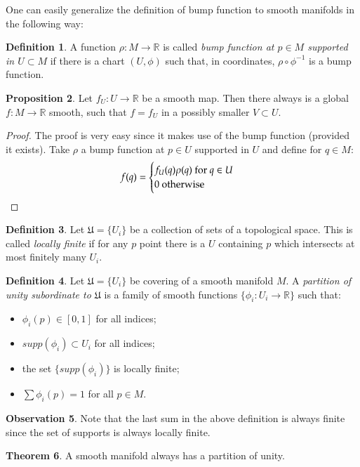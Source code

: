 \documentclass[12pt,a4paper]{report}
\theoremstyle{definition}
\newtheorem{Def}{Definition}[chapter]
\theoremstyle{Theorem}
\newtheorem{Theo}[Def]{Theorem}
\newtheorem{Prop}[Def]{Proposition}
\theoremstyle{break}
\theoremstyle{definition}
\newtheorem{Obs}[Def]{Observation}
\begin{document}
			One can easily generalize the definition of bump function to smooth manifolds in the following way:
			\begin{Def}
				A function $\rho:M\rightarrow \mathbb{R}$ is called \textit{bump function  at $p\in M$ supported in $U\subset M$} if there is a chart $(U,\phi)$ such that, in coordinates, $\rho\circ \phi^{-1}$ is a bump function.
			\end{Def}
			\begin{Prop}
				Let $f_U:U\rightarrow\mathbb{R}$ be a smooth map. Then there always is a global $f:M\rightarrow \mathbb{R}$ smooth, such that $f=f_U$ in a possibly smaller $V\subset U$.
			\end{Prop}
			\begin{proof}
				The proof is very easy since it makes use of the bump function (provided it exists). Take $\rho$ a bump function at $p\in U$ supported in $U$ and define for $q\in M$:
				$$f(q)=\begin{cases}
					f_U(q)\rho(q)\hbox{ for }q\in U\\
					0 \hbox{ otherwise}
				\end{cases}$$
			\end{proof}
			\begin{Def}
				Let $\mathfrak{U}=\{U_i\}$ be a collection of sets of a topological space. This is called \textit{locally finite} if for any $p$ point there is a $U$ containing $p$ which intersects at most finitely many $U_i$. 
			\end{Def}
			\begin{Def}
				Let $\mathfrak{U}=\{U_i\}$ be covering of a smooth manifold $M$. A \textit{partition of unity subordinate to $\mathfrak{U}$} is a family of smooth functions $\{\phi_i:U_i\rightarrow\mathbb{R}\}$ such that:
				\begin{itemize}
					\item $\phi_i(p)\in[0,1]$ for all indices;
					\item $supp(\phi_i)\subset U_i$ for all indices;
					\item the set $\{supp(\phi_i)\}$ is locally finite;
					\item $\sum \phi_i(p)=1$ for all $p\in M$.
				\end{itemize}
			\end{Def}
			\begin{Obs}
				Note that the last sum in the above definition is always finite since the set of supports is always locally finite.
			\end{Obs}
			\begin{Theo}
				A smooth manifold always has a partition of unity.
			\end{Theo}
\end{document}

